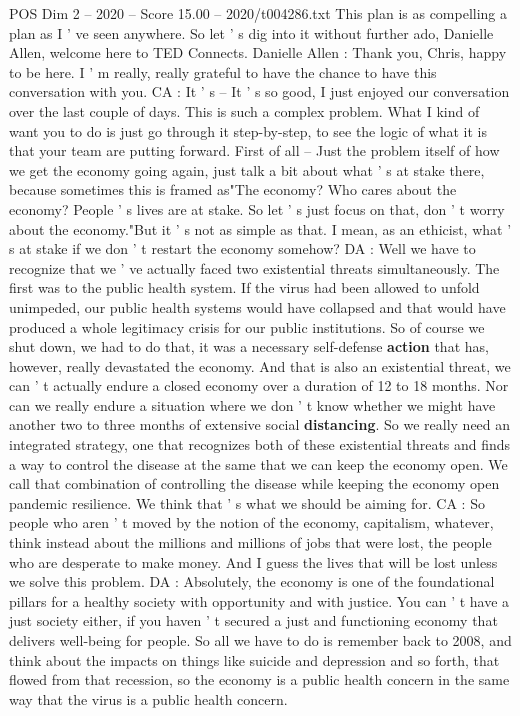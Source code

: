 \begin{textsample}{POS Dim 2 – 2020 – Score 15.00 – 2020/t004286.txt}
This plan is as compelling a plan as I ' ve seen anywhere.
So let ' s dig into it without further ado, Danielle Allen, welcome here to TED Connects.
Danielle Allen : Thank you, Chris, happy to be here.
I ' m really, really grateful to have the chance to have this conversation with you.
CA : It ' s -- It ' s so good, I just enjoyed our conversation over the last couple of days.
This is such a complex problem.
What I kind of want you to do is just go through it step-by-step, to see the logic of what it is that your team are putting forward.
First of all -- Just the problem itself of how we get the economy going again, just talk a bit about what ' s at stake there, because sometimes this is framed as"The economy?
Who cares about the economy?
People ' s lives are at stake.
So let ' s just focus on that, don ' t worry about the economy."But it ' s not as simple as that.
I mean, as an ethicist, what ' s at stake if we don ' t restart the economy somehow?
DA : Well we have to recognize that we ' ve actually faced two existential threats simultaneously.
The first was to the public health system.
If the virus had been allowed to unfold unimpeded, our public health systems would have collapsed and that would have produced a whole legitimacy crisis for our public institutions.
So of course we shut down, we had to do that, it was a necessary self-defense \textbf{action} that has, however, really devastated the economy.
And that is also an existential threat, we can ' t actually endure a closed economy over a duration of 12 to 18 months.
Nor can we really endure a situation where we don ' t know whether we might have another two to three months of extensive social \textbf{distancing}.
So we really need an integrated strategy, one that recognizes both of these existential threats and finds a way to control the disease at the same that we can keep the economy open.
We call that combination of controlling the disease while keeping the economy open pandemic resilience.
We think that ' s what we should be aiming for.
CA : So people who aren ' t moved by the notion of the economy, capitalism, whatever, think instead about the millions and millions of jobs that were lost, the people who are desperate to make money.
And I guess the lives that will be lost unless we solve this problem.
DA : Absolutely, the economy is one of the foundational pillars for a healthy society with opportunity and with justice.
You can ' t have a just society either, if you haven ' t secured a just and functioning economy that delivers well-being for people.
So all we have to do is remember back to 2008, and think about the impacts on things like suicide and depression and so forth, that flowed from that recession, so the economy is a public health concern in the same way that the virus is a public health concern.

\end{textsample}

